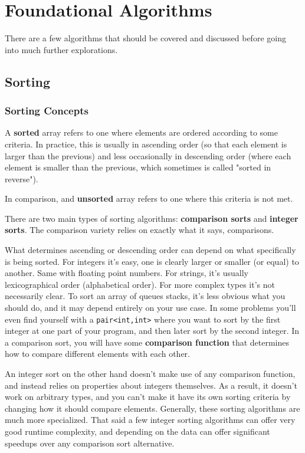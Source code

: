\section{Foundational Algorithms}

There are a few algorithms that should be covered and discussed before going into much further explorations.

\subsection{Sorting}

\subsubsection{Sorting Concepts}

A \textbf{sorted} array refers to one where elements are ordered according to some criteria. In practice, this is usually in ascending order (so that each element is larger than the previous) and less occasionally in descending order (where each element is smaller than the previous, which sometimes is called "sorted in reverse").

In comparison, and \textbf{unsorted} array refers to one where this criteria is not met.

There are two main types of sorting algorithms: \textbf{comparison sorts} and \textbf{integer sorts}. The comparison variety relies on exactly what it says, comparisons.

What determines ascending or descending order can depend on what specifically is being sorted. For integers it's easy, one is clearly larger or smaller (or equal) to another. Same with floating point numbers. For strings, it's usually lexicographical order (alphabetical order). For more complex types it's not necessarily clear. To sort an array of queues stacks, it's less obvious what you should do, and it may depend entirely on your use case. In some problems you'll even find yourself with a \texttt{pair<int,int>} where you want to sort by the first integer at one part of your program, and then later sort by the second integer. In a comparison sort, you will have some \textbf{comparison function} that determines how to compare different elements with each other.

An integer sort on the other hand doesn't make use of any comparison function, and instead relies on properties about integers themselves. As a result, it doesn't work on arbitrary types, and you can't make it have its own sorting criteria by changing how it should compare elements. Generally, these sorting algorithms are much more specialized. That said a few integer sorting algorithms can offer very good runtime complexity, and depending on the data can offer significant speedups over any comparison sort alternative.

